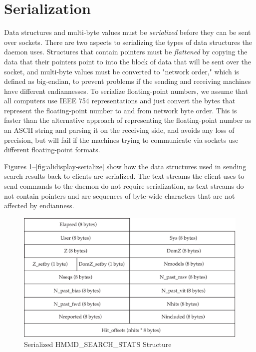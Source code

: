 \documentclass[notoc,justified]{tufte-book}    %
\begin{document}
{\section{Serialization}
Data structures and multi-byte values must be {\em serialized} before they can be sent over sockets.  There are two aspects to serializing the types of data structures the daemon uses.  Structures that contain pointers must be {\em flattened} by copying the data that their pointers point to into the block of data that will be sent over the socket, and multi-byte values must be converted to "network order," which is defined as big-endian, to prevent problems if the sending and receiving machines have different endiannesses.  To serialize floating-point numbers, we assume that all computers use IEEE 754 representations and just convert the bytes that represent the floating-point number to and from network byte order.  This is faster than the alternative approach of representing the floating-point number as an ASCII string and parsing it on the receiving side, and avoids any loss of precision, but will fail if the machines trying to communicate via sockets use different floating-point formats.  

Figures \ref{fig:search-stats-serialize}--\ref{fig:alidisplay-serialize} show how the data structures used in sending search results back to clients are serialized.  The text streams the client uses to send commands to the daemon do not require serialization, as text streams do not contain pointers and are sequences of byte-wide characters that are not affected by endianness.    

\begin{figure}
\includegraphics[width=\textwidth]{inclusions/hmmpgmd-search-stats-serialize.pdf}
\caption{Serialized {HMMD\_SEARCH\_STATS} Structure}
\label{fig:search-stats-serialize}
\end{figure} 

}
\end{document}
